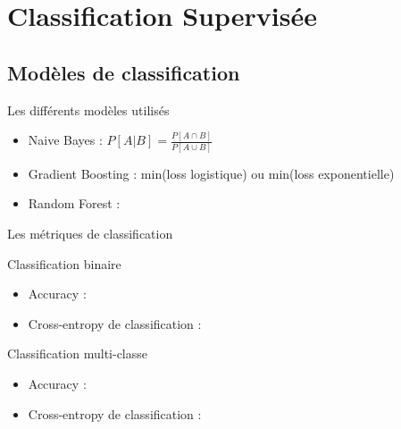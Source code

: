\documentclass[10pt]{beamer}
\begin{document}
\section{Classification Supervisée}
\subsection{Modèles de classification}
\begin{frame}{Les différents modèles utilisés}
    \begin{itemize}
        \item Naive Bayes : $ P[ A | B ] = \frac{P[ A \cap B ]}{P[ A \cup B ] }$
        \item Gradient Boosting : min(loss logistique) ou min(loss exponentielle)
        \item Random Forest :\\
    \end{itemize}
    \vfill
    
    Les métriques de classification \\
    \vspace{0.2cm}
    \begin{minipage}{0.48\linewidth}
        Classification binaire
        \begin{itemize}
            \item Accuracy : 
            \item Cross-entropy de classification : 
        \end{itemize}
    \end{minipage}
    \vline
    \hfill
    \begin{minipage}{0.48\linewidth}
        Classification multi-classe
        \begin{itemize}
            \item Accuracy : 
            \item Cross-entropy de classification : 
        \end{itemize}
    \end{minipage}
\end{frame}
\end{document}
